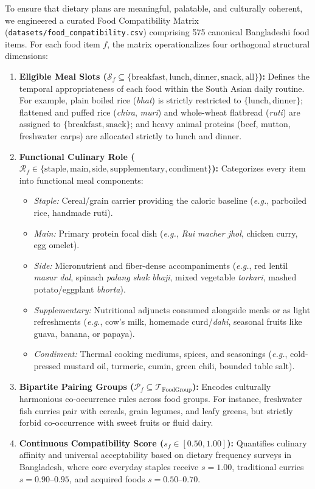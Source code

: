 \documentclass[5p,times,twocolumn]{elsarticle}
\newcommand{\eg}{\textit{e.g.}}
\begin{document}
To ensure that dietary plans are meaningful, palatable, and culturally coherent, we engineered a curated Food Compatibility Matrix (\texttt{datasets/food\_compatibility.csv}) comprising 575 canonical Bangladeshi food items. For each food item $f$, the matrix operationalizes four orthogonal structural dimensions:
\begin{enumerate}[leftmargin=*,itemsep=1.5pt]
  \item \textbf{Eligible Meal Slots ($\mathcal{S}_f \subseteq \{\text{breakfast}, \text{lunch}, \text{dinner}, \text{snack}, \text{all}\}$):} Defines the temporal appropriateness of each food within the South Asian daily routine. For example, plain boiled rice (\textit{bhat}) is strictly restricted to $\{\text{lunch}, \text{dinner}\}$; flattened and puffed rice (\textit{chira}, \textit{muri}) and whole-wheat flatbread (\textit{ruti}) are assigned to $\{\text{breakfast}, \text{snack}\}$; and heavy animal proteins (beef, mutton, freshwater carps) are allocated strictly to lunch and dinner.
  \item \textbf{Functional Culinary Role ($\mathcal{R}_f \in \{\text{staple}, \text{main}, \text{side}, \text{supplementary}, \text{condiment}\}$):} Categorizes every item into functional meal components:
  \begin{itemize}[leftmargin=*,itemsep=1.0pt]
    \item \textit{Staple:} Cereal/grain carrier providing the caloric baseline (\eg{}, parboiled rice, handmade ruti).
    \item \textit{Main:} Primary protein focal dish (\eg{}, \textit{Rui macher jhol}, chicken curry, egg omelet).
    \item \textit{Side:} Micronutrient and fiber-dense accompaniments (\eg{}, red lentil \textit{masur dal}, spinach \textit{palang shak bhaji}, mixed vegetable \textit{torkari}, mashed potato/eggplant \textit{bhorta}).
    \item \textit{Supplementary:} Nutritional adjuncts consumed alongside meals or as light refreshments (\eg{}, cow's milk, homemade curd/\textit{dahi}, seasonal fruits like guava, banana, or papaya).
    \item \textit{Condiment:} Thermal cooking mediums, spices, and seasonings (\eg{}, cold-pressed mustard oil, turmeric, cumin, green chili, bounded table salt).
  \end{itemize}
  \item \textbf{Bipartite Pairing Groups ($\mathcal{P}_f \subseteq \mathcal{T}_{\text{FoodGroup}}$):} Encodes culturally harmonious co-occurrence rules across food groups. For instance, freshwater fish curries pair with cereals, grain legumes, and leafy greens, but strictly forbid co-occurrence with sweet fruits or fluid dairy.
  \item \textbf{Continuous Compatibility Score ($s_f \in [0.50, 1.00]$):} Quantifies culinary affinity and universal acceptability based on dietary frequency surveys in Bangladesh, where core everyday staples receive $s=1.00$, traditional curries $s=0.90$--$0.95$, and acquired foods $s=0.50$--$0.70$.
\end{enumerate}
\end{document}
